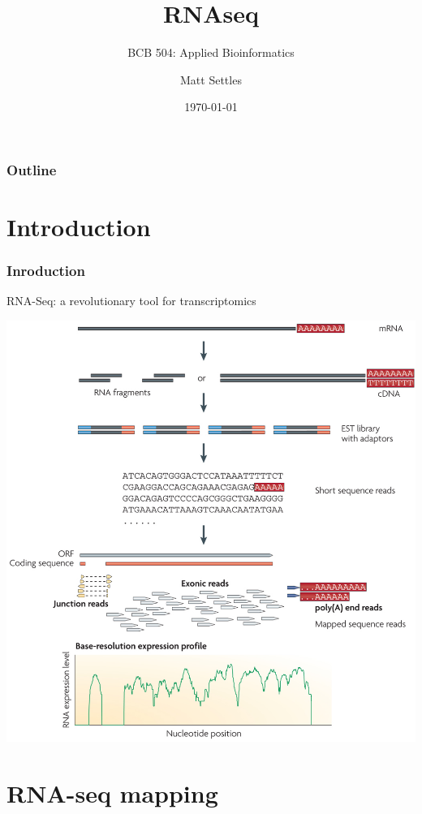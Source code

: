 \documentclass[pdf]{beamer}
\begin{document}
\title[RNAseq]{RNAseq}
\subtitle{BCB 504: Applied Bioinformatics\\}
\author[Matt Settles]{Matt Settles}
\date{\today}


\begin{frame}[plain]
  \titlepage
\end{frame}


\begin{frame}[plain] 
  \frametitle{Outline}
  \tableofcontents
\end{frame}

\section{Introduction}
\begin{frame}
  \frametitle{Inroduction}
\centering\alert{RNA-Seq: a revolutionary tool for transcriptomics}
\begin{center}
\includegraphics[scale=0.35]{Figures/nihms229948f1.jpg} 
\end{center}
\end{frame}

\section{RNA-seq mapping}
\end{document}
